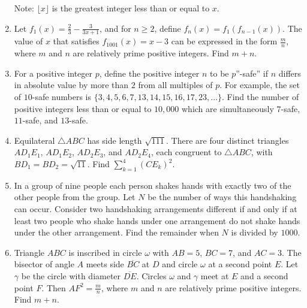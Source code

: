 \documentclass{article}
\begin{document}
\begin{enumerate}[label=\arabic*., itemsep=0.5em]
Note: \(\lfloor x \rfloor\) is the greatest integer less than or equal to \(x\).\par \vspace{0.5em}\item Let \(f_1(x) = \frac23 - \frac3{3x+1}\), and for \(n \ge 2\), define \(f_n(x) = f_1(f_{n-1}(x))\). The value of \(x\) that satisfies \(f_{1001}(x) = x-3\) can be expressed in the form \(\frac mn\), where \(m\) and \(n\) are relatively prime positive integers. Find \(m+n\).\par \vspace{0.5em}\item For a positive integer \(p\), define the positive integer \(n\) to be \(p\)''-safe'' if \(n\) differs in absolute value by more than \(2\) from all multiples of \(p\). For example, the set of \(10\)-safe numbers is \(\{ 3, 4, 5, 6, 7, 13, 14, 15, 16, 17, 23, \ldots\}\). Find the number of positive integers less than or equal to \(10,000\) which are simultaneously \(7\)-safe, \(11\)-safe, and \(13\)-safe.\par \vspace{0.5em}\item Equilateral \(\triangle ABC\) has side length \(\sqrt{111}\). There are four distinct triangles \(AD_1E_1\), \(AD_1E_2\), \(AD_2E_3\), and \(AD_2E_4\), each congruent to \(\triangle ABC\),
with \(BD_1 = BD_2 = \sqrt{11}\). Find \(\sum_{k=1}^4(CE_k)^2\).\par \vspace{0.5em}\item In a group of nine people each person shakes hands with exactly two of the other people from the group. Let \(N\) be the number of ways this handshaking can occur. Consider two handshaking arrangements different if and only if at least two people who shake hands under one arrangement do not shake hands under the other arrangement. Find the remainder when \(N\) is divided by \(1000\).\par \vspace{0.5em}\item Triangle \(ABC\) is inscribed in circle \(\omega\) with \(AB=5\), \(BC=7\), and \(AC=3\). The bisector of angle \(A\) meets side \(\overline{BC}\) at \(D\) and circle \(\omega\) at a second point \(E\). Let \(\gamma\) be the circle with diameter \(\overline{DE}\). Circles \(\omega\) and \(\gamma\) meet at \(E\) and a second point \(F\). Then \(AF^2 = \frac mn\), where \(m\) and \(n\) are relatively prime positive integers. Find \(m+n\).\par \vspace{0.5em}\end{enumerate}
\end{document}
